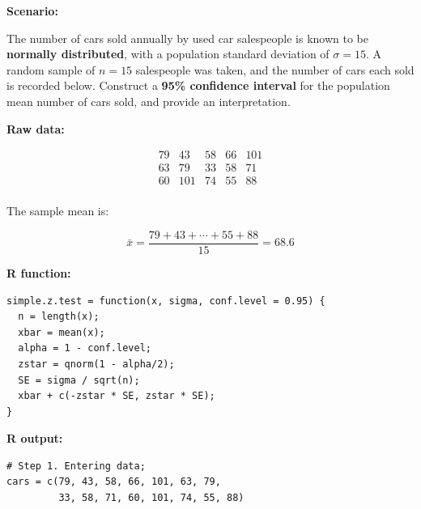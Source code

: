 \begin{example}

\vspace{1em}

\noindent\textbf{Scenario:}

\vspace{0.5em}

The number of cars sold annually by used car salespeople is known to be \textbf{normally distributed}, with a population standard deviation of $\sigma = 15$. A random sample of $n = 15$ salespeople was taken, and the number of cars each sold is recorded below. Construct a \textbf{95\% confidence interval} for the population mean number of cars sold, and provide an interpretation.

\vspace{1em}

\noindent\textbf{Raw data:}

\[
\begin{matrix}
79 & 43 & 58 & 66 & 101 \\
63 & 79 & 33 & 58 & 71 \\
60 & 101 & 74 & 55 & 88 \\
\end{matrix}
\]

\vspace{0.5em}

\noindent The sample mean is:

\[
\bar{x} = \frac{79 + 43 + \cdots + 55 + 88}{15} = 68.6
\]

\vspace{1em}

\noindent\textbf{R function:}

\begin{tcolorbox}[colback=gray!10, colframe=gray!50, arc=2mm]
\begin{verbatim}
simple.z.test = function(x, sigma, conf.level = 0.95) {
  n = length(x);
  xbar = mean(x);
  alpha = 1 - conf.level;
  zstar = qnorm(1 - alpha/2);
  SE = sigma / sqrt(n);
  xbar + c(-zstar * SE, zstar * SE);
}
\end{verbatim}
\end{tcolorbox}

\vspace{0.5em}

\noindent\textbf{R output:}

\begin{tcolorbox}[colback=gray!10, colframe=black!45, arc=2mm]
\begin{verbatim}
# Step 1. Entering data;
cars = c(79, 43, 58, 66, 101, 63, 79,
         33, 58, 71, 60, 101, 74, 55, 88)


\end{verbatim}
\end{tcolorbox}
\end{example}
